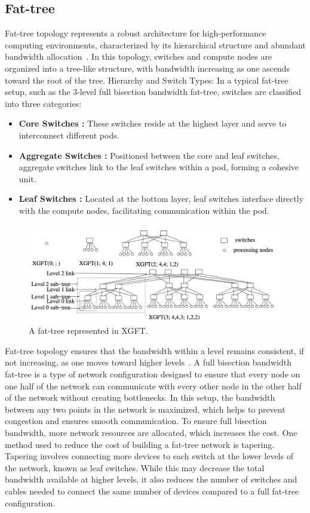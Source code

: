 \subsection{Fat-tree} Fat-tree topology represents a robust architecture for
high-performance computing environments, characterized by its hierarchical
structure and abundant bandwidth allocation~\cite{leiserson1985fat}. In this topology, switches and
compute nodes are organized into a tree-like structure, with bandwidth
increasing as one ascends toward the root of the tree.  Hierarchy and Switch
Types: In a typical fat-tree setup, such as the 3-level full bisection bandwidth
fat-tree, switches are classified into three categories: 

\begin{itemize} 
\item \textbf{Core Switches :} These switches reside at the highest layer and serve to interconnect different pods.
\item \textbf{Aggregate Switches :} Positioned between the core and leaf switches, aggregate switches link to the leaf switches within a pod, forming a cohesive unit.
\item \textbf{Leaf Switches :} Located at the bottom layer, leaf switches interface directly with the compute nodes, facilitating communication within the pod.
\end{itemize} 

\begin{figure}[h!]
  \centering
  \includegraphics[width=0.8\columnwidth]{./figs/xgft.png}
  \caption{A fat-tree represented in XGFT.}
  \label{fig:fat-treexgft}
\end{figure}

Fat-tree topology ensures that the bandwidth within a level
remains consistent, if not increasing, as one moves toward higher levels~\cite{leiserson1985fat, jain2017predicting}.  A
full bisection bandwidth fat-tree is a type of network configuration designed to
ensure that every node on one half of the network can communicate with every
other node in the other half of the network without creating bottlenecks. In
this setup, the bandwidth between any two points in the network is maximized,
which helps to prevent congestion and ensures smooth communication. 
To ensure
full bisection bandwidth, more network resources are allocated, which increases
the cost.  One method used to reduce the cost of building a fat-tree network is
tapering. Tapering involves connecting more devices to each switch at the lower
levels of the network, known as leaf switches. While this may decrease the total
bandwidth available at higher levels, it also reduces the number of switches and
cables needed to connect the same number of devices compared to a full fat-tree
configuration.  

